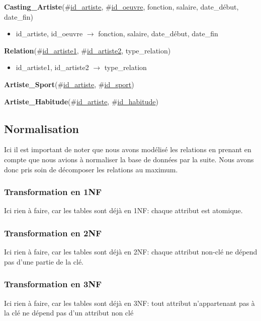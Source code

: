 \documentclass{article}
\begin{document}
\newpage
\noindent
\textbf{Casting\_Artiste}(\#\underline{id\_artiste}, \#\underline{id\_oeuvre}, fonction, salaire, date\_début, date\_fin)

\begin{itemize}
\item id\_artiste, id\_oeuvre $\rightarrow$ fonction, salaire, date\_début, date\_fin
\end{itemize}

\vspace{2mm}
\noindent
\textbf{Relation}(\#\underline{id\_artiste1}, \#\underline{id\_artiste2}, type\_relation)

\begin{itemize}
\item id\_artiste1, id\_artiste2 $\rightarrow$ type\_relation
\end{itemize}

\vspace{2mm}
\noindent
\textbf{Artiste\_Sport}(\#\underline{id\_artiste}, \#\underline{id\_sport})

\vspace{2mm}
\noindent
\textbf{Artiste\_Habitude}(\#\underline{id\_artiste}, \#\underline{id\_habitude})



\subsection{Normalisation}
Ici il est important de noter que nous avons modélisé les relations
en prenant en compte que nous avions à normaliser la base de données
par la suite. Nous avons donc pris soin de décomposer les relations
au maximum.
\subsubsection*{Transformation en 1NF}
Ici rien à faire, car les tables sont déjà en 1NF: chaque attribut est
atomique.

\subsubsection*{Transformation en 2NF}
Ici rien à faire, car les tables sont déjà en 2NF: chaque attribut
non-clé ne dépend pas d'une partie de la clé.

\subsubsection*{Transformation en 3NF}
Ici rien à faire, car les tables sont déjà en 3NF:
tout attribut n'appartenant pas à la clé ne dépend pas d'un attribut non clé
\vspace{5mm}
\end{document}
